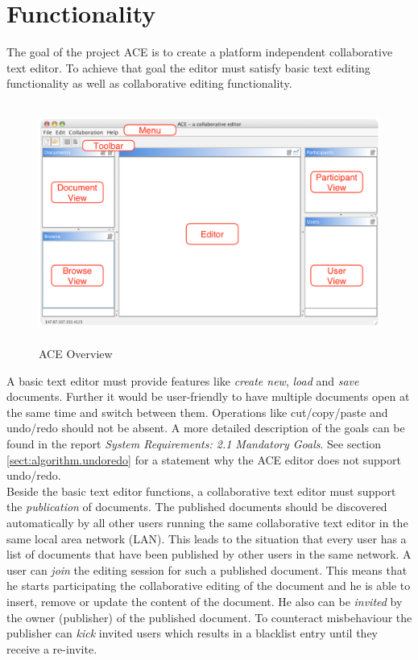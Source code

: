 \chapter{Functionality}
\label{chapter:functionality}

The goal of the project ACE is to create a platform independent collaborative text editor. To achieve that goal the editor must satisfy basic text editing functionality as well as collaborative editing functionality.\\

\begin{figure}[H]
\begin{center}
  \includegraphics[height=3.1in, width=5.1in]{../images/finalreport/application_ace_overview.eps}
\caption{ACE Overview}
\end{center}
\end{figure}

A basic text editor must provide features like \emph{create new}, \emph{load} and \emph{save} documents. Further it would be user-friendly to have multiple documents open at the same time and switch between them. Operations like cut/copy/paste and undo/redo should not be absent. A more detailed description of the goals can be found in the report \textit{System Requirements: 2.1 Mandatory Goals}. See section \ref{sect:algorithm.undoredo} for a statement why the ACE editor does not support undo/redo.\\

Beside the basic text editor functions, a collaborative text editor must support the \textit{publication} of documents. The published documents should be discovered automatically by all other users running the same collaborative text editor in the same local area network (LAN). This leads to the situation that every user has a list of documents that have been published by other users in the same network. A user can \textit{join} the editing session for such a published document. This means that he starts participating the collaborative editing of the document and he is able to insert, remove or update the content of the document. He also can be \textit{invited} by the owner (publisher) of the published document. To counteract misbehaviour the publisher can \textit{kick} invited users which results in a blacklist entry until they receive a re-invite.

